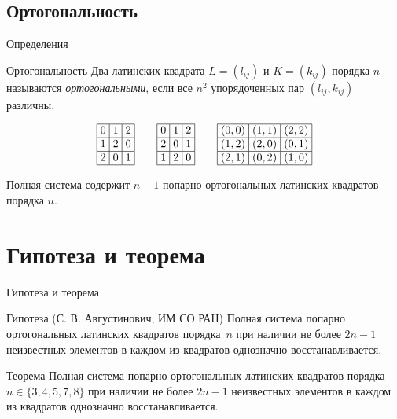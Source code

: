 \documentclass[8pt, hyperref={pdftex,unicode}]{beamer}
\newcommand{\LSfive}[1]{
    \begin{array}{|>{\hspace{-2pt}}c<{\hspace{-2pt}}|>{\hspace{-2pt}}c<{\hspace{-2pt}}|>{\hspace{-2pt}}c<{\hspace{-2pt}}|>{\hspace{-2pt}}c<{\hspace{-2pt}}|>{\hspace{-2pt}}c<{\hspace{-2pt}}|}\hline
        #1
    \end{array}
}
\begin{document}
\subsection{Ортогональность}
\begin{frame}{Определения}

    \begin{block}{Ортогональность}
        Два латинских квадрата $L = (l_{ij})$ и $K = (k_{ij})$ порядка $n$ называются {\it ортогональными}, если все $n^2$ упорядоченных пар $(l_{ij}, k_{ij})$ различны.
    \end{block}

    $$
        \LSfive{
            0 & 1 & 2 \\ \hline
            1 & 2 & 0 \\ \hline
            2 & 0 & 1 \\ \hline
        }
        \hspace{2em}
        \LSfive{
            0 & 1 & 2 \\ \hline
            2 & 0 & 1 \\ \hline
            1 & 2 & 0 \\ \hline
        }
        \hspace{2em}
        \LSfive{
            (0, 0) & (1, 1) & (2, 2) \\ \hline
            (1, 2) & (2, 0) & (0, 1) \\ \hline
            (2, 1) & (0, 2) & (1, 0) \\ \hline
        }
    $$

    \begin{block}{}
        Полная система содержит $n-1$ попарно ортогональных латинских квадратов порядка $n$.
    \end{block}


\end{frame}


\section{Гипотеза и теорема}
\begin{frame}{Гипотеза и теорема}

    \begin{block}{Гипотеза (С. В. Августинович, ИМ СО РАН)}
        Полная система попарно ортогональных латинских квадратов порядка~$n$ при наличии не более $2n-1$ неизвестных элементов в каждом из квадратов однозначно восстанавливается.
    \end{block}

    \begin{block}{Теорема}
        Полная система попарно ортогональных латинских квадратов порядка $n \in \{3,4,5,7,8\}$ при наличии не более $2n-1$ неизвестных элементов в каждом из квадратов однозначно восстанавливается.
    \end{block}

\end{frame}
\end{document}
